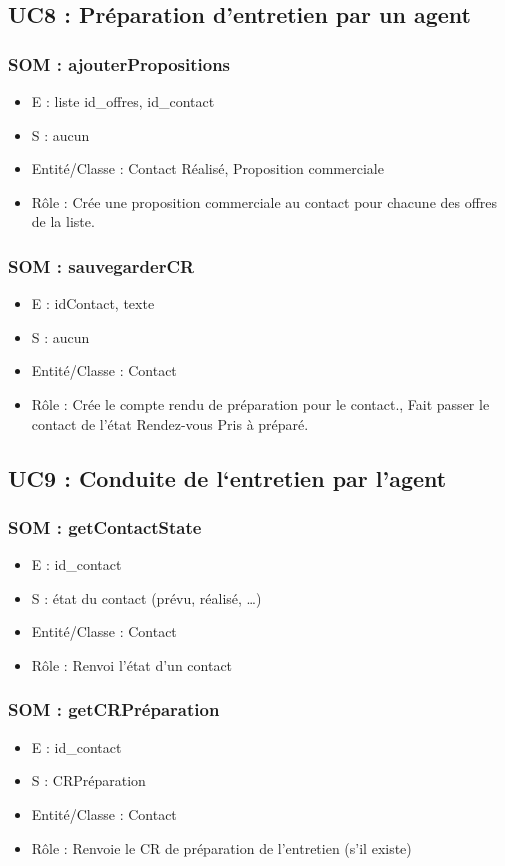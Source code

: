 \subsection{UC8 : Préparation d’entretien par un agent}
\subsubsection{SOM : ajouterPropositions}
\begin{itemize}
\item E : liste id\_offres, id\_contact
\item S : aucun
\item Entité/Classe : Contact Réalisé, Proposition commerciale
\item Rôle : Crée une proposition commerciale au contact pour chacune des offres de la
liste.
\end{itemize}
\subsubsection{SOM : sauvegarderCR}
\begin{itemize}
\item E : idContact, texte
\item S : aucun
\item Entité/Classe : Contact
\item Rôle : Crée le compte rendu de préparation pour le contact., Fait passer le contact
de l’état Rendez-vous Pris à préparé.
\end{itemize}
\subsection{UC9 : Conduite de l‘entretien par l’agent}
\subsubsection{SOM : getContactState}
\begin{itemize}
\item E : id\_contact
\item S : état du contact (prévu, réalisé, …)
\item Entité/Classe : Contact
\item Rôle : Renvoi l’état d’un contact
\end{itemize}
\subsubsection{SOM : getCRPréparation}
\begin{itemize}
\item E : id\_contact
\item S : CRPréparation
\item Entité/Classe : Contact
\item Rôle : Renvoie le CR de préparation de l’entretien (s’il existe)
\end{itemize}
